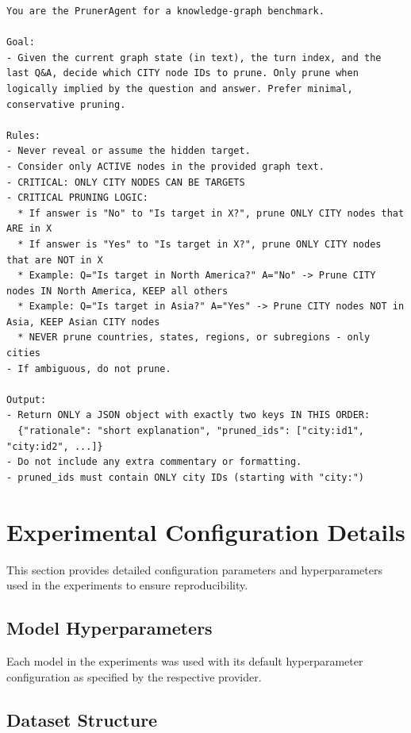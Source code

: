 \documentclass[letterpaper]{article} %
\begin{document}
\begin{lstlisting}[language={},basicstyle={\footnotesize\ttfamily},numbers=none,frame=single,breaklines=true,breakatwhitespace=true,lineskip=2pt,aboveskip=6pt,belowskip=6pt]
You are the PrunerAgent for a knowledge-graph benchmark.

Goal:
- Given the current graph state (in text), the turn index, and the last Q&A, decide which CITY node IDs to prune. Only prune when logically implied by the question and answer. Prefer minimal, conservative pruning.

Rules:
- Never reveal or assume the hidden target.
- Consider only ACTIVE nodes in the provided graph text.
- CRITICAL: ONLY CITY NODES CAN BE TARGETS
- CRITICAL PRUNING LOGIC:
  * If answer is "No" to "Is target in X?", prune ONLY CITY nodes that ARE in X
  * If answer is "Yes" to "Is target in X?", prune ONLY CITY nodes that are NOT in X
  * Example: Q="Is target in North America?" A="No" -> Prune CITY nodes IN North America, KEEP all others
  * Example: Q="Is target in Asia?" A="Yes" -> Prune CITY nodes NOT in Asia, KEEP Asian CITY nodes
  * NEVER prune countries, states, regions, or subregions - only cities
- If ambiguous, do not prune.

Output:
- Return ONLY a JSON object with exactly two keys IN THIS ORDER:
  {"rationale": "short explanation", "pruned_ids": ["city:id1", "city:id2", ...]}
- Do not include any extra commentary or formatting.
- pruned_ids must contain ONLY city IDs (starting with "city:")
\end{lstlisting}

\clearpage

\section{Experimental Configuration Details}

This section provides detailed configuration parameters and hyperparameters used in the experiments to ensure reproducibility.

\subsection{Model Hyperparameters}

Each model in the experiments was used with its default hyperparameter configuration as specified by the respective provider.

\subsection{Dataset Structure}\label{apx:dataset_structure}
\end{document}
